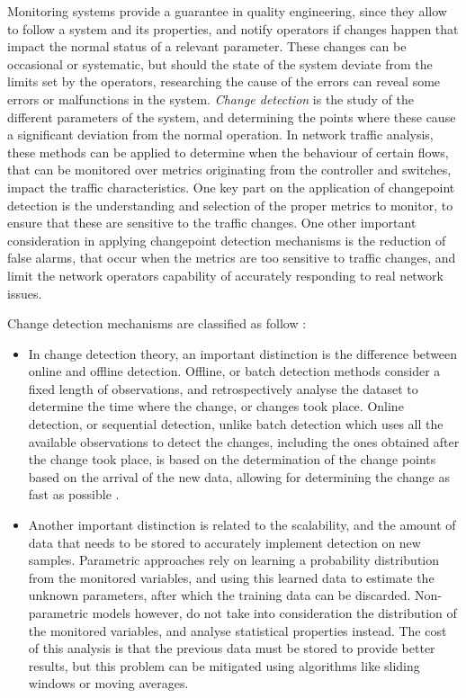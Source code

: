 \par Monitoring systems provide a guarantee in quality engineering, since they allow to follow a system and its properties, and notify operators if changes happen
that impact the normal status of a relevant parameter. These changes can be occasional or systematic, but should the state of the system deviate from the limits set
by the operators, researching the cause of the errors can reveal some errors or malfunctions in the system. \textit{Change detection} is the study of the different 
parameters of the system, and determining the points where these cause a significant deviation from the normal operation. In network traffic analysis, these methods
can be applied to determine when the behaviour of certain flows, that can be monitored over metrics originating from the controller and switches, impact the traffic
characteristics. One key part on the application of changepoint detection is the understanding and selection of the proper metrics to monitor, to ensure that these
are sensitive to the traffic changes. One other important consideration in applying changepoint detection mechanisms is the reduction of false alarms, that occur 
when the metrics are too sensitive to traffic changes, and limit the network operators capability of accurately responding to real network issues. 

\par Change detection mechanisms are classified as follow  \cite{munz_traffic_2010}:

\begin {itemize}
    \item In change detection theory, an important distinction is the difference between online and offline detection. Offline, or batch detection 
        methods consider a fixed length of observations, and retrospectively analyse the dataset to determine the time where the change, or changes took place. 
        Online detection, or sequential detection, unlike batch detection which uses all the available observations to detect the changes, including the
        ones obtained after the change took place, is based on the determination of the change points based on the arrival of the new data, allowing for determining
        the change as fast as possible \cite{ahmed_novel_2008}. 
    \item Another important distinction is related to the scalability, and the amount of data that needs to be stored to accurately implement
        detection on new samples. Parametric approaches rely on learning a probability distribution from the monitored variables, and using this learned data to 
        estimate the unknown parameters, after which the training data can be discarded. Non-parametric models however, do not take into consideration the
        distribution of the monitored variables, and analyse statistical properties instead. The cost of this analysis is that the previous data must be stored to
        provide better results, but this problem can be mitigated using algorithms like sliding windows or moving averages.
\end {itemize}

